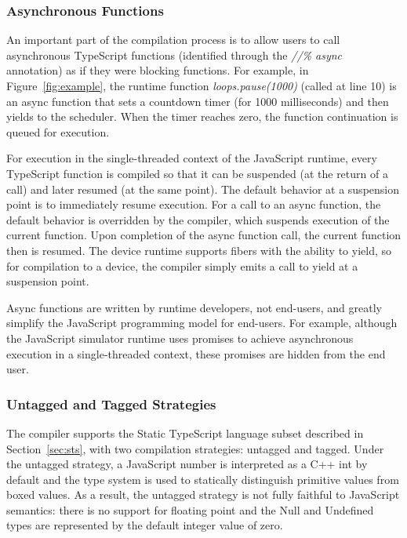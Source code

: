 \subsubsection{Asynchronous Functions}

An important part of the compilation process is to allow users to call asynchronous 
TypeScript functions (identified through the \emph{//\% async} annotation) 
as if they were blocking functions.  For example, in Figure~\ref{fig:example}, the runtime 
function \emph{loops.pause(1000)} (called at line 10) 
is an async function that sets a countdown timer (for 1000 milliseconds) 
and then yields to the scheduler. When the timer 
reaches zero, the function continuation is queued for execution. 

For execution in the single-threaded context of the JavaScript runtime,
every TypeScript function is compiled so that it can be suspended (at the return of a call) and later resumed (at the same point). 
The default behavior at a suspension point is to immediately resume execution.  For a call to an async function,
the default behavior is overridden by the compiler, which suspends execution of the current function. 
Upon completion of the async function call, the current function then is resumed. 
The \CO device runtime supports fibers with the ability to yield, so for compilation to a device, 
the compiler simply emits a call to yield at a suspension point.

Async functions are written by runtime developers, not end-users, and greatly simplify the JavaScript
programming model for end-users. For example, although the JavaScript simulator runtime uses promises to 
achieve asynchronous execution in a single-threaded context, these promises are hidden from the end user. 

\subsubsection{Untagged and Tagged Strategies}

The \MC compiler supports the Static TypeScript language subset described in Section~\ref{sec:sts},
with two compilation strategies: untagged and tagged. Under the untagged strategy,
a JavaScript number is interpreted as a C++ int by default and the type system is used
to statically distinguish primitive values from boxed values. As a result, the untagged
strategy is not fully faithful to JavaScript semantics: there is no support for floating
point and the Null and Undefined types are represented by the default integer value of zero.

